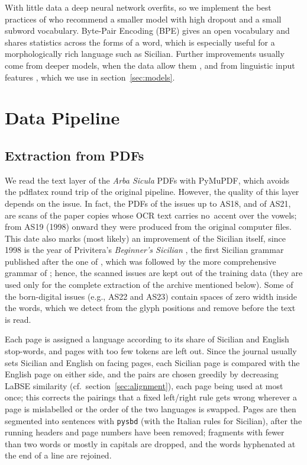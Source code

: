\documentclass[11pt,a4paper]{article}
\begin{document}
With little data a deep neural network overfits,
so we implement the best practices
of \citet{sennrich2019loresnmt}
who recommend a smaller model with high dropout
\citep{srivastava2014dropout} and a small subword vocabulary. Byte-Pair Encoding (BPE)
\citep{sennrich2016subword} gives an open vocabulary and shares statistics across the forms of a
word, which is especially useful for a morphologically rich language such as Sicilian. Further
improvements usually come from deeper models, when the data allow them
\citep{micelibarone2017deep}, and from linguistic input features \citep{sennrich2016linguistic},
which we use in section~\ref{sec:models}.



\section{Data Pipeline}
\label{sec:pipeline}
\subsection{Extraction from PDFs}
We read the text layer of the \emph{Arba Sicula} PDFs with PyMuPDF, which avoids the pdflatex
round trip of the original pipeline. However, the quality of this layer depends on the issue.
In fact, the PDFs of the issues up to AS18, and of AS21, are scans of the paper copies whose OCR text
carries no~accent over the vowels; from AS19 (1998) onward they were produced from the original computer
files. This date also marks (most likely) an improvement of the Sicilian itself,
since 1998 is the year of Privitera's \emph{Beginner's Sicilian} \citep{privitera1998},
the first Sicilian grammar published after the one of \citet{pitre1875},
which was followed by the more comprehensive grammar of \citet{bonner2001}; hence,
the scanned issues are kept out of the training data (they are used only for the complete
extraction of the archive mentioned below). Some of the born-digital issues (e.g., AS22 and AS23)
contain spaces of zero width inside the words, which we detect from the glyph positions and
remove before the text is read.

Each page is assigned a language according to its share of Sicilian and English stop-words, and
pages with too few tokens are left out. Since the journal usually sets Sicilian and English on
facing pages, each Sicilian page is compared with the English page on either side, and the
pairs are chosen greedily by decreasing LaBSE similarity (cf.\ section~\ref{sec:alignment}),
each page being used at most once; this corrects the pairings that a fixed left/right rule gets
wrong wherever a page is mislabelled or the order of the two languages is swapped.
Pages are then segmented into sentences with \texttt{pysbd} (with the Italian rules for Sicilian),
after the running headers and page numbers have been removed; fragments with fewer than two words or
mostly in capitals are dropped, and the words hyphenated at the end of a line are rejoined.
\end{document}
